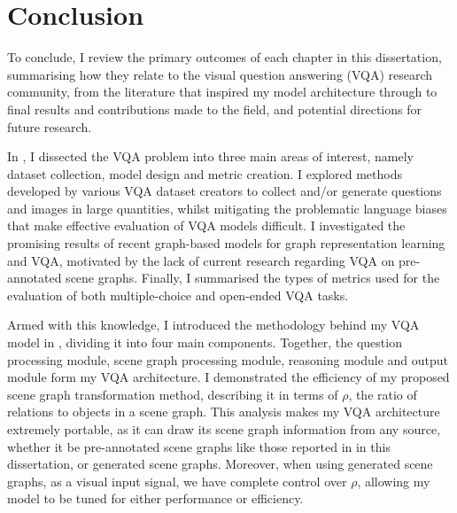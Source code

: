 \chapter{Conclusion}
\label{chapter:conclusion}

To conclude, I review the primary outcomes of each chapter in this dissertation, summarising how they relate to the visual question answering (VQA) research community, from the literature that inspired my model architecture through to final results and contributions made to the field, and potential directions for future research.

In \chapterautorefname{ \ref{chapter:literature}}, I dissected the VQA problem into three main areas of interest, namely dataset collection, model design and metric creation. I explored methods developed by various VQA dataset creators to collect and/or generate questions and images in large quantities, whilst mitigating the problematic language biases that make effective evaluation of VQA models difficult. I investigated the promising results of recent graph-based models for graph representation learning and VQA, motivated by the lack of current research regarding VQA on pre-annotated scene graphs. Finally, I summarised the types of metrics used for the evaluation of both multiple-choice and open-ended VQA tasks.

Armed with this knowledge, I introduced the methodology behind my VQA model in \chapterautorefname{ \ref{chapter:methodology}}, dividing it into four main components. Together, the question processing module, scene graph processing module, reasoning module and output module form my VQA architecture. I demonstrated the efficiency of my proposed scene graph transformation method, describing it in terms of \(\rho\), the ratio of relations to objects in a scene graph. This analysis makes my VQA architecture extremely portable, as it can draw its scene graph information from any source, whether it be pre-annotated scene graphs like those reported in in this dissertation, or generated scene graphs. Moreover, when using generated scene graphs, as a visual input signal, we have complete control over \(\rho\), allowing my model to be tuned for either performance or efficiency.

